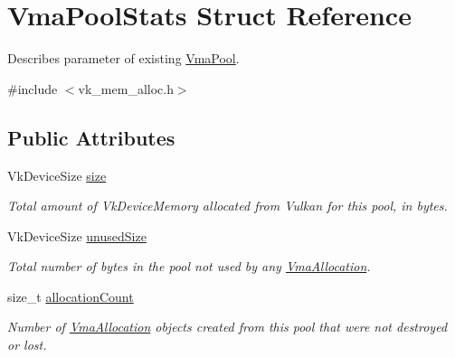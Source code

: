 \hypertarget{structVmaPoolStats}{}\section{Vma\+Pool\+Stats Struct Reference}
\label{structVmaPoolStats}


Describes parameter of existing \hyperlink{structVmaPool}{Vma\+Pool}.  




{\ttfamily \#include $<$vk\+\_\+mem\+\_\+alloc.\+h$>$}

\subsection*{Public Attributes}
\begin{DoxyCompactItemize}
\item 
\mbox{\label{structVmaPoolStats_a326807b2de2b0931cee4ed9a5f2e420c}} 
Vk\+Device\+Size \hyperlink{structVmaPoolStats_a326807b2de2b0931cee4ed9a5f2e420c}{size}
\begin{DoxyCompactList}\small\item\em Total amount of {\ttfamily Vk\+Device\+Memory} allocated from Vulkan for this pool, in bytes. \end{DoxyCompactList}\item 
\mbox{\label{structVmaPoolStats_ad7c54874724fce7b06aba526202d82a8}} 
Vk\+Device\+Size \hyperlink{structVmaPoolStats_ad7c54874724fce7b06aba526202d82a8}{unused\+Size}
\begin{DoxyCompactList}\small\item\em Total number of bytes in the pool not used by any \hyperlink{structVmaAllocation}{Vma\+Allocation}. \end{DoxyCompactList}\item 
\mbox{\label{structVmaPoolStats_ad1924eb54fffa45e9e0e65670c8fe5eb}} 
size\+\_\+t \hyperlink{structVmaPoolStats_ad1924eb54fffa45e9e0e65670c8fe5eb}{allocation\+Count}
\begin{DoxyCompactList}\small\item\em Number of \hyperlink{structVmaAllocation}{Vma\+Allocation} objects created from this pool that were not destroyed or lost. \end{DoxyCompactList}\item 
\mbox{\label{structVmaPoolStats_ae4f3546ffa4d1e598b64d8e6134854f4}} 

\end{DoxyCompactItemize}
